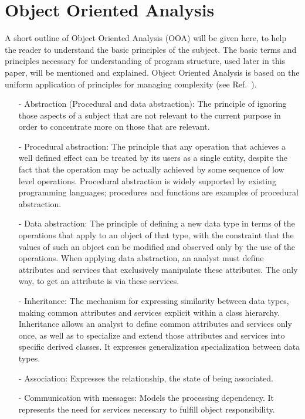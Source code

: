 \documentclass[a4paper]{article}
\begin{document}
\section{Object Oriented Analysis}
A short outline of Object Oriented Analysis (OOA) will be given here, to
help the reader to understand
the basic principles of the subject. The basic terms and
principles necessary for understanding of program structure, used
later in this paper, will be mentioned and explained. 
Object Oriented Analysis  is based on the uniform application of 
principles for managing complexity (see Ref.~\cite{CoadYourdon}).
\begin{itemize}
\item[-]
Abstraction (Procedural and data abstraction): The principle of ignoring
those aspects of a subject that are not relevant to the current purpose
in order to concentrate more on those that are relevant.
\item[-]
Procedural abstraction: The principle that any operation that achieves
a well defined effect can be treated by its users as a single entity,
despite the fact that the operation may be actually achieved by some
sequence of low level operations. Procedural abstraction is widely
supported by existing programming languages; procedures and functions
are examples of procedural abstraction.
\item[-]
Data abstraction: The principle of defining a new data type in terms of
the operations that apply to an object of that type, with the constraint
that the values of such an object can be modified and observed only by
the use of the operations. When applying data abstraction, an analyst
must define attributes and services that exclusively
manipulate these attributes. The only way, to get an attribute is via
these services.
\item[-]
Inheritance: The mechanism for expressing similarity between data types,
making common attributes and services explicit within a class
hierarchy. Inheritance allows an analyst to define common attributes
and services only once, as well as to specialize and extend those
attributes and services into specific derived classes. It expresses
generalization specialization between data types.
\item[-]
Association: Expresses the relationship, the state of being associated. 
\item[-]
Communication with messages: Models the processing dependency. It
represents the need for services necessary to fulfill object responsibility.
\end{itemize}
\end{document}
